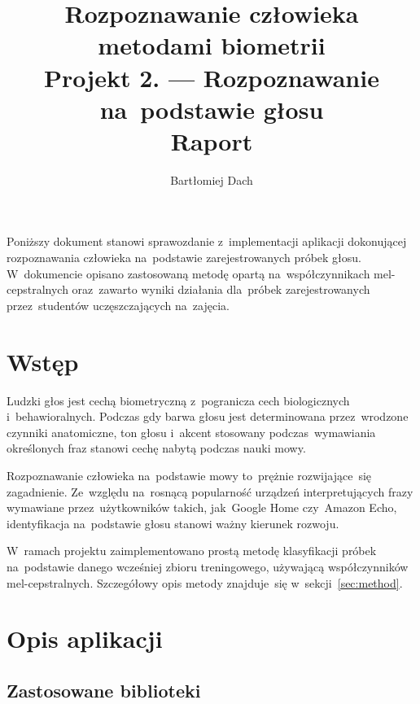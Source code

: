 \documentclass[11pt,a4paper]{article}
\begin{document}
\title{Rozpoznawanie człowieka metodami biometrii \\
\Large{
    Projekt 2. --- Rozpoznawanie na~podstawie głosu \\
    Raport
}}
\author{Bartłomiej Dach}
\maketitle

Poniższy dokument stanowi sprawozdanie z~implementacji aplikacji dokonującej rozpoznawania człowieka na~podstawie zarejestrowanych próbek głosu.
W~dokumencie opisano zastosowaną metodę opartą na~współczynnikach mel-cepstralnych oraz~zawarto wyniki działania dla~próbek zarejestrowanych przez~studentów uczęszczających na~zajęcia.

\section{Wstęp}

Ludzki głos jest cechą biometryczną z~pogranicza cech biologicznych i~behawioralnych.
Podczas gdy barwa głosu jest determinowana przez~wrodzone czynniki anatomiczne, ton głosu i~akcent stosowany podczas~wymawiania określonych fraz stanowi cechę nabytą podczas nauki mowy.

Rozpoznawanie człowieka na~podstawie mowy to~prężnie rozwijające~się zagadnienie.
Ze~względu na~rosnącą popularność urządzeń interpretujących frazy wymawiane przez~użytkowników takich, jak~Google Home czy~Amazon Echo, identyfikacja na~podstawie głosu stanowi ważny kierunek rozwoju.

W~ramach projektu zaimplementowano prostą metodę klasyfikacji próbek na~podstawie danego wcześniej zbioru treningowego, używającą współczynników mel-cepstralnych.
Szczegółowy opis metody znajduje~się w~sekcji~\ref{sec:method}.

\section{Opis aplikacji}

\subsection{Zastosowane biblioteki}
\end{document}
